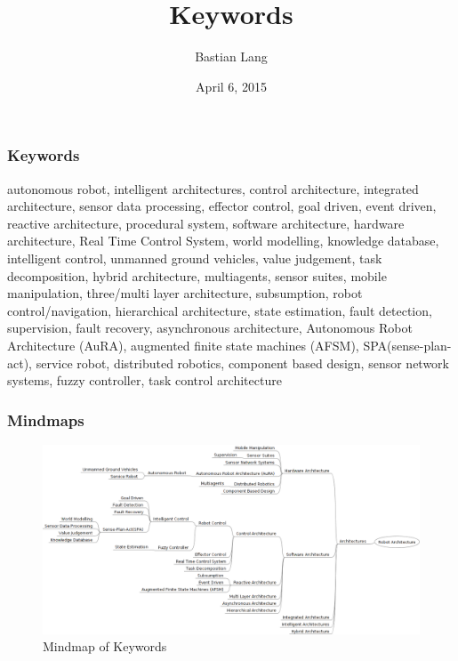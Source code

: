 \documentclass[8pt]{beamer}
\title[Keywords]{Keywords} %
\author{Bastian Lang} %
\institute[BRSU] %
{
Master of Autonomous Systems \\ %
}
\date{April 6, 2015}
\begin{document}
\listoffigures
\begin{frame}
\titlepage 
\end{frame}

\begin{frame}
\frametitle{Keywords}
autonomous robot, intelligent architectures, control architecture, integrated architecture, sensor data processing, effector control, goal driven, event driven, reactive architecture, procedural system, software architecture, hardware architecture, Real Time Control System, world modelling, knowledge database, intelligent control, unmanned ground vehicles, value judgement, task decomposition, hybrid architecture, multiagents, sensor suites, mobile manipulation, three/multi layer architecture, subsumption, robot control/navigation, hierarchical architecture, state estimation, fault detection, supervision, fault recovery, asynchronous architecture, Autonomous Robot Architecture (AuRA), augmented finite state machines (AFSM), SPA(sense-plan-act), service robot, distributed robotics, component based design, sensor network systems, fuzzy controller, task control architecture

\end{frame}

\begin{frame}
\frametitle{Mindmaps}
\begin{figure}
\includegraphics[scale=0.24]{taxonomy.png}
\caption{Mindmap of Keywords}
\end{figure}

\end{frame}
\end{document}
